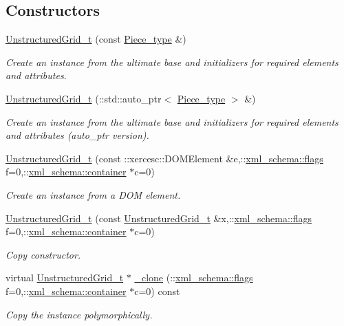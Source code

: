 \subsection*{Constructors}
\begin{DoxyCompactItemize}
\item 
\hyperlink{classUnstructuredGrid__t_a00bf6957ea7e3313e2890bd4c02f8981}{Unstructured\-Grid\-\_\-t} (const \hyperlink{classUnstructuredGrid__t_a559913611314b34f4868027fc91e35bc}{Piece\-\_\-type} \&)
\begin{DoxyCompactList}\small\item\em Create an instance from the ultimate base and initializers for required elements and attributes. \end{DoxyCompactList}\item 
\hyperlink{classUnstructuredGrid__t_a528c5e53cac3c45f9e5a2ff37197d1c8}{Unstructured\-Grid\-\_\-t} (\-::std\-::auto\-\_\-ptr$<$ \hyperlink{classUnstructuredGrid__t_a559913611314b34f4868027fc91e35bc}{Piece\-\_\-type} $>$ \&)
\begin{DoxyCompactList}\small\item\em Create an instance from the ultimate base and initializers for required elements and attributes (auto\-\_\-ptr version). \end{DoxyCompactList}\item 
\hyperlink{classUnstructuredGrid__t_ad6fb3d97ad8d9443d53e1152a9fa6004}{Unstructured\-Grid\-\_\-t} (const \-::xercesc\-::\-D\-O\-M\-Element \&e,\-::\hyperlink{namespacexml__schema_a8d981c127a1f5106d04ad5853e707361}{xml\-\_\-schema\-::flags} f=0,\-::\hyperlink{namespacexml__schema_a395f5179c5fc4643909d66e9ff28d8ca}{xml\-\_\-schema\-::container} $\ast$c=0)
\begin{DoxyCompactList}\small\item\em Create an instance from a D\-O\-M element. \end{DoxyCompactList}\item 
\hyperlink{classUnstructuredGrid__t_a893b6debad8369f36a3cdc2aaa22b478}{Unstructured\-Grid\-\_\-t} (const \hyperlink{classUnstructuredGrid__t}{Unstructured\-Grid\-\_\-t} \&x,\-::\hyperlink{namespacexml__schema_a8d981c127a1f5106d04ad5853e707361}{xml\-\_\-schema\-::flags} f=0,\-::\hyperlink{namespacexml__schema_a395f5179c5fc4643909d66e9ff28d8ca}{xml\-\_\-schema\-::container} $\ast$c=0)
\begin{DoxyCompactList}\small\item\em Copy constructor. \end{DoxyCompactList}\item 
virtual \hyperlink{classUnstructuredGrid__t}{Unstructured\-Grid\-\_\-t} $\ast$ \hyperlink{classUnstructuredGrid__t_ae51f374b8650e990f30723bdcf181f2d}{\-\_\-clone} (\-::\hyperlink{namespacexml__schema_a8d981c127a1f5106d04ad5853e707361}{xml\-\_\-schema\-::flags} f=0,\-::\hyperlink{namespacexml__schema_a395f5179c5fc4643909d66e9ff28d8ca}{xml\-\_\-schema\-::container} $\ast$c=0) const 
\begin{DoxyCompactList}\small\item\em Copy the instance polymorphically. \end{DoxyCompactList}\end{DoxyCompactItemize}



